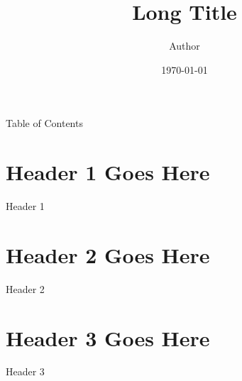 \documentclass[aspectratio=1610]{beamer} %
\title[Short Title]{\normalsize Long Title}
\author{Author}
\date{\today}
\institute[Short name]{Long Name \\ Department \\ Extra Info}
\begin{document}
	\maketitle
	
	\begin{frame}{Table of Contents}
		\tableofcontents
	\end{frame}

	\section{Header 1 Goes Here}
		\begin{frame}{Header 1}
			\lipsum[1]
		\end{frame}

	\section{Header 2 Goes Here}
	\begin{frame}{Header 2}
		\lipsum[1]
	\end{frame}

	\section{Header 3 Goes Here}
	\begin{frame}{Header 3}
		\lipsum[1]
	\end{frame}
\end{document}
